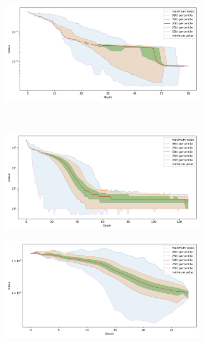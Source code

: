 \documentclass{article}
\begin{document}
\begin{figure}[ht!]
\begin{subfigure}[b]{0.47\textwidth}
    \label{fig:results:sift-radius}
    \end{subfigure}%
    \begin{subfigure}[b]{0.47\textwidth}
    \includegraphics[width=0.95\textwidth]{images/radius/radio-ml-97920.png}\\
    \label{fig:results:radioml-radius}
    \end{subfigure}%
    \\
    \begin{subfigure}[b]{0.47\textwidth}
    \includegraphics[width=0.95\textwidth]{images/radius/silva-2224640.png}\\
    \label{fig:results:silva-radius}
    \end{subfigure}%
    \begin{subfigure}[b]{0.47\textwidth}
    \includegraphics[width=0.95\textwidth]{images/radius/random-1000000.png}\\

\end{subfigure}
\end{figure}
\end{document}
